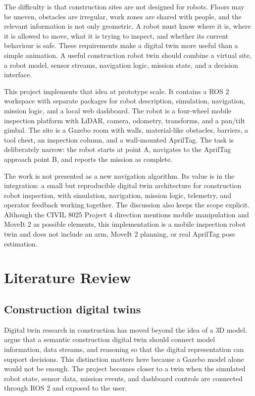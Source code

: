 \documentclass[12pt,a4paper]{article}
\begin{document}
The difficulty is that construction sites are not designed for robots. Floors may be uneven, obstacles are irregular, work zones are shared with people, and the relevant information is not only geometric. A robot must know where it is, where it is allowed to move, what it is trying to inspect, and whether its current behaviour is safe. These requirements make a digital twin more useful than a simple animation. A useful construction robot twin should combine a virtual site, a robot model, sensor streams, navigation logic, mission state, and a decision interface.

This project implements that idea at prototype scale. It contains a ROS 2 workspace with separate packages for robot description, simulation, navigation, mission logic, and a local web dashboard. The robot is a four-wheel mobile inspection platform with LiDAR, camera, odometry, transforms, and a pan/tilt gimbal. The site is a Gazebo room with walls, material-like obstacles, barriers, a tool chest, an inspection column, and a wall-mounted AprilTag. The task is deliberately narrow: the robot starts at point A, navigates to the AprilTag approach point B, and reports the mission as complete.

The work is not presented as a new navigation algorithm. Its value is in the integration: a small but reproducible digital twin architecture for construction robot inspection, with simulation, navigation, mission logic, telemetry, and operator feedback working together. The discussion also keeps the scope explicit. Although the CIVIL 8025 Project 4 direction mentions mobile manipulation and MoveIt 2 as possible elements, this implementation is a mobile inspection robot twin and does not include an arm, MoveIt 2 planning, or real AprilTag pose estimation.

\section{Literature Review}

\subsection{Construction digital twins}

Digital twin research in construction has moved beyond the idea of a 3D model. \citet{boje2020semantic} argue that a semantic construction digital twin should connect model information, data streams, and reasoning so that the digital representation can support decisions. This distinction matters here because a Gazebo model alone would not be enough. The project becomes closer to a twin when the simulated robot state, sensor data, mission events, and dashboard controls are connected through ROS 2 and exposed to the user.
\end{document}
